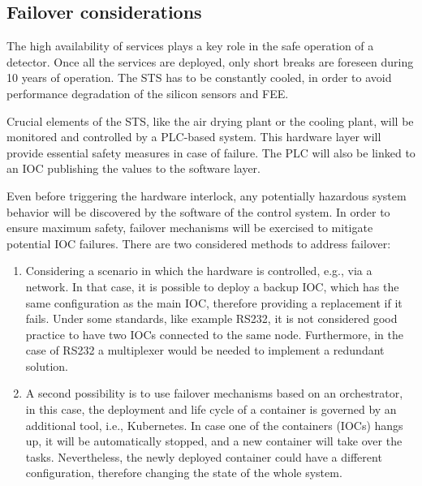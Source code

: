 \subsection{Failover considerations}
The high availability of services plays a key role in the safe operation of a detector. Once all the services are deployed, only short breaks are foreseen during 10 years of operation. The STS has to be constantly cooled, in order to avoid performance degradation of the silicon sensors and \gls{FEE}.

Crucial elements of the STS, like the air drying plant or the cooling plant, will be monitored and controlled by a \gls{PLC}-based system. This hardware layer will provide essential safety measures in case of failure. The \gls{PLC} will also be linked to an \gls{IOC} publishing the values to the software layer. 

Even before triggering the hardware interlock, any potentially hazardous system behavior will be discovered by the software of the control system. In order to ensure maximum safety, failover mechanisms will be exercised to mitigate potential \gls{IOC} failures. There are two considered methods to address failover:
\begin{enumerate}
    \item Considering a scenario in which the hardware is controlled, e.g., via a network. In that case, it is possible to deploy a backup \gls{IOC}, which has the same configuration as the main \gls{IOC}, therefore providing a replacement if it fails. Under some standards, like example RS232, it is not considered good practice to have two \glspl{IOC} connected to the same node. Furthermore, in the case of RS232 a multiplexer would be needed to implement a redundant solution. 
    \item A second possibility is to use failover mechanisms based on an orchestrator, in this case, the deployment and life cycle of a container is governed by an additional tool, i.e., Kubernetes. In case one of the containers (\glspl{IOC}) hangs up, it will be automatically stopped, and a new container will take over the tasks. Nevertheless, the newly deployed container could have a different configuration, therefore changing the state of the whole system. 
\end{enumerate}






